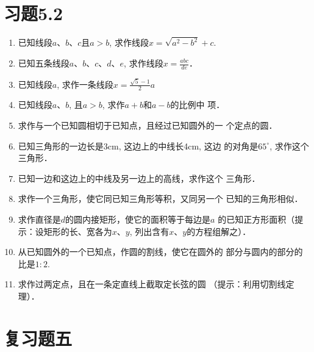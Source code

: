 \section*{习题5.2}
\begin{enumerate}
    \item 已知线段$a$、$b$、$c$且$a>b$, 求作线段$x=\sqrt{a^2-b^2}+c$.
    \item 已知五条线段$a$、$b$、$c$、$d$、$e$, 求作线段$x=\frac{abc}{de}$．
    \item 已知线段$a$, 求作一条线段$x=\frac{\sqrt{5}-1}{2}a$
    \item 已知线段$a$、$b$, 且$a>b$, 求作$a+b$和$a-b$的比例中
    项．
    \item 求作与一个已知圆相切于已知点，且经过已知圆外的一
    个定点的圆．
    \item 已知三角形的一边长是3cm, 这边上的中线长4cm, 这边
    的对角是$65^{\circ}$, 求作这个三角形．
    \item 已知一边和这边上的中线及另一边上的高线，求作这个
    三角形．
    \item 求作一个三角形，使它同已知三角形等积，又同另一个
    已知的三角形相似．
    \item 求作直径是$d$的圆内接矩形，使它的面积等于每边是$a$
    的已知正方形面积（提示：设矩形的长、宽各为$x$、$y$,
    列出含有$x$、$y$的方程组解之）．
    \item 从已知圆外的一个已知点，作圆的割线，使它在圆外的
    部分与圆内的部分的比是$1:2$.
    \item 求作过两定点，且在一条定直线上截取定长弦的圆
    （提示：利用切割线定理）．
\end{enumerate}

\section*{复习题五}

